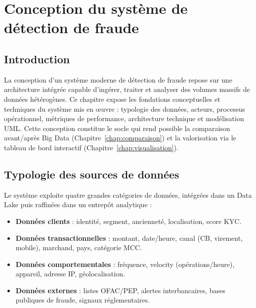 \chapter{Conception du système de détection de fraude}
\label{chap:conception}

\section{Introduction}
La conception d’un système moderne de détection de fraude repose sur une architecture intégrée capable d’ingérer, traiter et analyser des volumes massifs de données hétérogènes.  
Ce chapitre expose les fondations conceptuelles et techniques du système mis en œuvre : typologie des données, acteurs, processus opérationnel, métriques de performance, architecture technique et modélisation UML. Cette conception constitue le socle qui rend possible la comparaison avant/après Big Data (Chapitre~\ref{chap:comparaison}) et la valorisation via le tableau de bord interactif (Chapitre~\ref{chap:visualisation}).

\section{Typologie des sources de données}
Le système exploite quatre grandes catégories de données, intégrées dans un Data Lake puis raffinées dans un entrepôt analytique :

\begin{itemize}
    \item \textbf{Données clients} : identité, segment, ancienneté, localisation, score KYC.
    \item \textbf{Données transactionnelles} : montant, date/heure, canal (CB, virement, mobile), marchand, pays, catégorie MCC.
    \item \textbf{Données comportementales} : fréquence, velocity (opérations/heure), appareil, adresse IP, géolocalisation.
    \item \textbf{Données externes} : listes OFAC/PEP, alertes interbancaires, bases publiques de fraude, signaux réglementaires.
\end{itemize}

